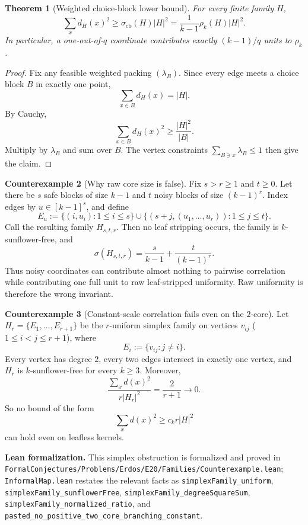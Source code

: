 \documentclass[11pt]{article}
\newtheorem{theorem}{Theorem}[section]
\theoremstyle{definition}
\newtheorem{counterexample}[theorem]{Counterexample}
\newcommand{\1}{\mathbf{1}}
\newcommand{\leannote}[1]{\par\smallskip\noindent\textbf{Lean formalization.} #1\par\smallskip}
\begin{document}
\begin{theorem}[Weighted choice-block lower bound]\label{thm:weighted-choice-block}
For every finite family $H$,
\[
\sum_x d_H(x)^2\ge \sigma_{\mathrm{cb}}(H)|H|^2
=\frac{1}{k-1}\rho_k(H)|H|^2.
\]
In particular, a one-out-of-$q$ coordinate contributes exactly $(k-1)/q$ units to $\rho_k$.
\end{theorem}

\begin{proof}
Fix any feasible weighted packing $(\lambda_B)$. Since every edge meets a choice block $B$ in exactly one point,
\[
\sum_{x\in B} d_H(x)=|H|.
\]
By Cauchy,
\[
\sum_{x\in B} d_H(x)^2\ge \frac{|H|^2}{|B|}.
\]
Multiply by $\lambda_B$ and sum over $B$. The vertex constraints $\sum_{B\ni x}\lambda_B\le 1$ then give the claim.
\end{proof}

\begin{counterexample}[Why raw core size is false]
Fix $s>r\ge 1$ and $t\ge 0$. Let there be $s$ safe blocks of size $k-1$ and $t$ noisy blocks of size $(k-1)^r$. Index edges by $u\in [k-1]^s$, and define
\[
E_u:=\{(i,u_i):1\le i\le s\}\cup \{(s+j,(u_1,\dots,u_r)):1\le j\le t\}.
\]
Call the resulting family $H_{s,t,r}$. Then no leaf stripping occurs, the family is $k$-sunflower-free, and
\[
\sigma(H_{s,t,r})=\frac{s}{k-1}+\frac{t}{(k-1)^r}.
\]
Thus noisy coordinates can contribute almost nothing to pairwise correlation while contributing one full unit to raw leaf-stripped uniformity. Raw uniformity is therefore the wrong invariant.
\end{counterexample}

\begin{counterexample}[Constant-scale correlation fails even on the $2$-core]\label{ce:simplex}
Let $H_r=\{E_1,\dots,E_{r+1}\}$ be the $r$-uniform simplex family on vertices $v_{ij}$ ($1\le i<j\le r+1$), where
\[
E_i:=\{v_{ij}:j\neq i\}.
\]
Every vertex has degree $2$, every two edges intersect in exactly one vertex, and $H_r$ is $k$-sunflower-free for every $k\ge 3$.
Moreover,
\[
\frac{\sum_x d(x)^2}{r|H_r|^2}=\frac{2}{r+1}\to 0.
\]
So no bound of the form
\[
\sum_x d(x)^2\ge c_k r|H|^2
\]
can hold even on leafless kernels.
\end{counterexample}

\leannote{This simplex obstruction is formalized and proved in \texttt{FormalConjectures/Problems/Erdos/E20/Families/Counterexample.lean}; \texttt{InformalMap.lean} restates the relevant facts as \texttt{simplexFamily\_uniform}, \texttt{simplexFamily\_sunflowerFree}, \texttt{simplexFamily\_degreeSquareSum}, \texttt{simplexFamily\_normalized\_ratio}, and \texttt{pasted\_no\_positive\_two\_core\_branching\_constant}.}
\end{document}
